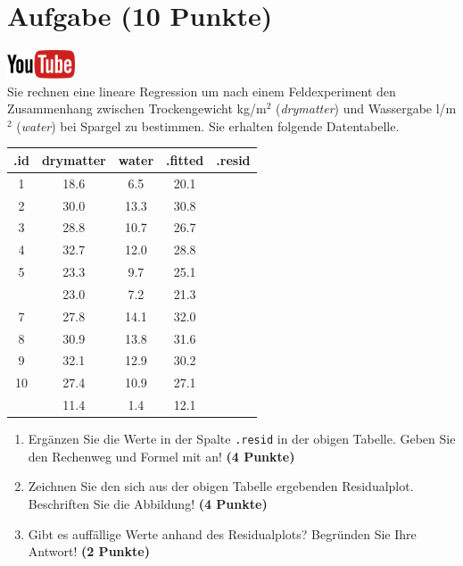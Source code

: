 \documentclass[a4paper, 10pt]{scrartcl}\usepackage[]{graphicx}\usepackage[]{xcolor}
\newenvironment{knitrout}{}{} %
\begin{document}
 
\clearpage

\section{Aufgabe \hfill (10 Punkte)}

\hfill\href{https://youtu.be/dyQlYV9nOqY}{\includegraphics[width =
  2cm]{img/youtube}}\\[1Ex]

Sie rechnen eine lineare Regression um nach einem Feldexperiment den
Zusammenhang zwischen Trockengewicht kg/m$^2$ (\textit{drymatter}) und
Wassergabe l/m$^2$ (\textit{water}) bei Spargel zu bestimmen. Sie erhalten
folgende Datentabelle.

\begin{knitrout}
\color{fgcolor}\begin{table}[!h]
\centering\begingroup\fontsize{12}{14}\selectfont

\begin{tabular}{ccccc}
\toprule
.id & drymatter & water & .fitted & .resid\\
\midrule
1 & 18.6 & 6.5 & 20.1 & \\
2 & 30.0 & 13.3 & 30.8 & \\
3 & 28.8 & 10.7 & 26.7 & \\
4 & 32.7 & 12.0 & 28.8 & \\
5 & 23.3 & 9.7 & 25.1 & \\
\addlinespace
6 & 23.0 & 7.2 & 21.3 & \\
7 & 27.8 & 14.1 & 32.0 & \\
8 & 30.9 & 13.8 & 31.6 & \\
9 & 32.1 & 12.9 & 30.2 & \\
10 & 27.4 & 10.9 & 27.1 & \\
\addlinespace
11 & 11.4 & 1.4 & 12.1 & \\
\bottomrule
\end{tabular}
\endgroup{}
\end{table}

\end{knitrout}

\begin{enumerate}
\item Erg{\"a}nzen Sie die Werte in der Spalte \texttt{.resid} in der obigen
  Tabelle. Geben Sie den Rechenweg und Formel mit an! \textbf{(4 Punkte)}
\item Zeichnen Sie den sich aus der obigen Tabelle ergebenden
  Residualplot. Beschriften Sie die Abbildung! \textbf{(4 Punkte)}
\item Gibt es auff{\"a}llige Werte anhand des Residualplots? Begr{\"u}nden Sie Ihre
  Antwort! \textbf{(2 Punkte)}
\end{enumerate}
 
\end{document}
